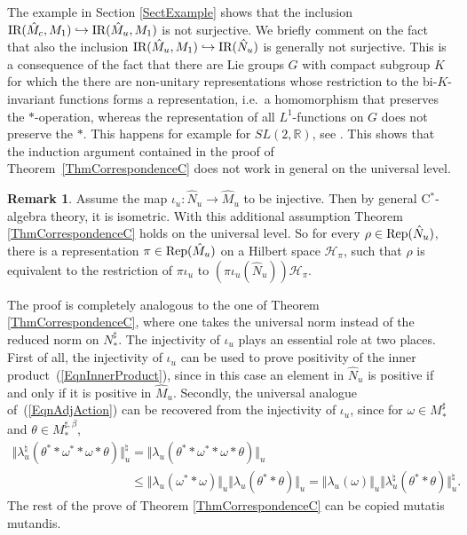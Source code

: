 \documentclass[11pt]{article}
\numberwithin{equation}{section}
\theoremstyle{definition}
\newtheorem{rmk}[thm]{Remark}
\newcommand{\Rep}{\text{\rm Rep}}
\newcommand{\cHil}{\mathcal{H}}
\newcommand{\IR}{\text{\rm IR}}
\begin{document}
The example in Section \ref{SectExample} shows that the inclusion $\IR(\hat{M}_c, M_1) \hookrightarrow \IR(\hat{M}_u, M_1)$ is not surjective. We brief\/ly comment on the fact that also the inclusion $\IR(\hat{M}_u, M_1) \hookrightarrow \IR(\hat{N}_u)$ is generally not surjective. This is a consequence of the fact that there are Lie groups $G$ with compact subgroup $K$ for which the there are non-unitary representations whose restriction to the bi-$K$-invariant functions forms a representation, i.e.\ a homomorphism that preserves the $\ast$-operation, whereas the representation of all $L^1$-functions on $G$ does not preserve the $\ast$. This happens for example for $SL(2, \mathbb{R})$, see \cite[Example~1.1.2 on p.~37 and p.~40]{Vog}.
 This shows that the induction argument contained in the proof of Theorem~\ref{ThmCorrespondenceC} does not work in general on the universal level.

\begin{rmk}\label{RmkIotaUIsNotInjective}
Assume the map $\iota_u: \hat{N}_u \rightarrow \hat{M}_u$ to be injective. Then by general C$^\ast$-algebra theory, it is isometric. With this additional assumption Theorem \ref{ThmCorrespondenceC} holds on the universal level. So for every $\rho \in \Rep(\hat{N}_u)$, there is a representation $\pi \in \Rep(\hat{M}_u)$ on a Hilbert space $\cHil_\pi$, such that $\rho$ is equivalent to the restriction of $\pi \iota_u$ to $(\pi \iota_u(\hat{N}_u))\cHil_\pi$.

The proof is completely analogous to the one of Theorem \ref{ThmCorrespondenceC}, where one takes the universal norm instead of the reduced norm on $N_\ast^\sharp$. The injectivity of $\iota_u$ plays an essential role at two places. First of all, the injectivity of $\iota_u$ can be used to prove positivity of the inner product~(\ref{EqnInnerProduct}), since in this case an element in $\hat{N}_u$ is positive if and only if it is positive in $\hat{M}_u$. Secondly, the universal analogue of~(\ref{EqnAdjAction}) can be recovered from the injectivity of $\iota_u$, since for $\omega \in M_\ast^\sharp$ and $\theta \in M_\ast^{\sharp, \beta}$,
\begin{gather*}
 \Vert \lambda_u^\natural (\theta^\ast \ast \omega^\ast \ast \omega \ast \theta) \Vert_u^\natural
 = \Vert \lambda_u (\theta^\ast \ast \omega^\ast \ast \omega \ast \theta) \Vert_u \\
\phantom{\Vert \lambda_u^\natural (\theta^\ast \ast \omega^\ast \ast \omega \ast \theta) \Vert_u^\natural}{}
 \leq   \Vert  \lambda_u(\omega^\ast \ast \omega) \Vert_u  \Vert \lambda_u (\theta^\ast  \ast \theta) \Vert_u
  = \Vert \lambda_u(\omega) \Vert_u \Vert \lambda_u^\natural (\theta^\ast  \ast \theta) \Vert_u^\natural.
\end{gather*}
The rest of the prove of Theorem \ref{ThmCorrespondenceC} can be copied mutatis mutandis.
\end{rmk}
\end{document}
